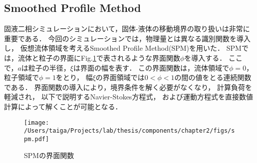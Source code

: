 \subsection{Smoothed Profile Method}
固液二相シミュレーションにおいて，固体-液体の移動境界の取り扱いは非常に重要である．
今回のシミュレーションでは，物理量とは異なる識別関数を導入し，
仮想流体領域を考えるSmoothed Profile Method(SPM)\cite{}を用いた．
SPMでは，流体と粒子の界面にFig.\ref{fig:spm}で表されるような界面関数$\phi$を導入する．
ここで，$a$は粒子の半径，$\xi$は界面の幅を表す．
この界面関数は，流体領域で$\phi=0$，粒子領域で$\phi=1$をとり，
幅$\xi$の界面領域では$0< \phi <1$の間の値をとる連続関数である．
界面関数の導入により，境界条件を解く必要がなくなり，
計算負荷を軽減され，
以下で説明するNavier-Stokes方程式，
および運動方程式を直接数値計算によって解くことが可能となる．

    \begin{figure}[H]
        \centering
        \texttt{[image: /Users/taiga/Projects/lab/thesis/components/chapter2/figs/spm.pdf]}
        \caption{SPMの界面関数}
        \label{fig:spm}
    \end{figure}

